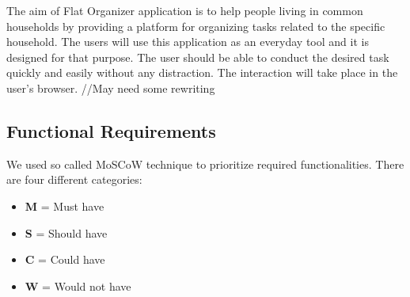 \documentclass{sig-alt-release2}
\begin{document}
The aim of Flat Organizer application is to help people living in common households by providing a platform for organizing tasks related to the specific household. The users will use this application as an everyday tool and it is designed for that purpose. The user should be able to conduct the desired task quickly and easily without any distraction. The interaction will take place in the user{'}s browser. //May need some rewriting

\subsection{Functional Requirements}

We used so called MoSCoW technique to prioritize required functionalities. There are four different categories: 
\begin{itemize}
\item \textbf{M} = Must have
\item \textbf{S} = Should have
\item \textbf{C} = Could have
\item \textbf{W} = Would not have
\end{itemize}
	
\end{document}
